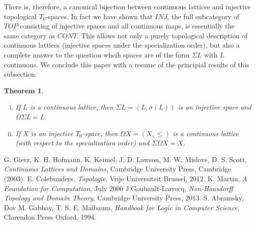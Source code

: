 \documentclass[a4paper,12pt]{article}
\newtheorem{theorem}{Theorem}[section]
\begin{document}
There is, therefore, a canonical bijection between continuous lattices and injective topological $T_0$-spaces. In fact we have shown that $INJ$, the full subcategory of $TOP$ consisting of injective spaces and all continuous maps, is essentially the same category as $CONT$. This allows not only a purely topological description of continuous lattices (injective spaces under the specialization order), but also a complete answer to the question whcih spaces are of the form $\Sigma L$ with $L$ continuous. We conclude this paper with a resume of the principial results of this subsection:

\begin{theorem}
\begin{enumerate}[(i)]
  \item If $L$ is a continuous lattice, then $\Sigma L = (L, \sigma(L))$ is an injective space and $\Omega\Sigma L = L$.
  \item If $X$ is an injective $T_0$-space, then $\Omega X = (X, \leq)$ is a continuous lattice (with respect to the specialization order) and $\Sigma\Omega X = X$.
\end{enumerate}
\end{theorem}

\newpage

\begin{thebibliography}{99}
 G. Gierz, K. H. Hofmann, K. Keimel, J. D. Lawson, M. W. Mislove, D. S. Scott, {\em Continuous Lattices and Domains}, Cambridge University Press, Cambridge (2003).
 E. Colebunders, \emph{Topologie}, Vrije Universiteit Brussel, 2012.
 K. Martin, \emph{A Foundation for Computation}, July 2000
 J.Goubault-Larrecq, \emph{Non-Hausdorff Topology and Domain Theory}, Cambridge University Press, 2013.
 S. Abramsky, Dov M. Gabbay, T. S. E. Maibaum, \emph{Handbook for Logic in
Computer Science}, Clarendon Press Oxford, 1994.
    \end{thebibliography}
\end{document}
